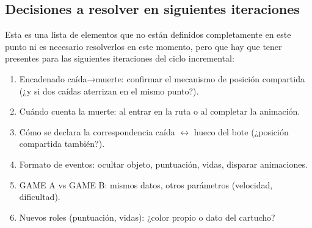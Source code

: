 \subsection{Decisiones a resolver en siguientes iteraciones}

Esta es una lista de elementos que no están definidos completamente en este punto ni es necesario resolverlos en este momento, pero que hay que tener presentes para las siguientes iteraciones del ciclo incremental:

\begin{enumerate}
	\item Encadenado caída→muerte: confirmar el mecanismo de posición compartida (¿y si dos caídas aterrizan en el mismo punto?).
	\item Cuándo cuenta la muerte: al entrar en la ruta o al completar la animación.
	\item Cómo se declara la correspondencia caída $\longleftrightarrow$ hueco del bote (¿posición compartida también?).
	\item Formato de eventos: ocultar objeto, puntuación, vidas, disparar animaciones.
	\item GAME A vs GAME B: mismos datos, otros parámetros (velocidad, dificultad).
	\item Nuevos roles (puntuación, vidas): ¿color propio o dato del cartucho?
\end{enumerate}



\clearpage

